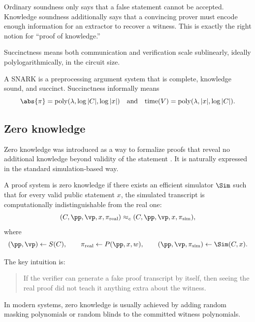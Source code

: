 \begin{remark}
Ordinary soundness only says that a false statement cannot be accepted. Knowledge soundness additionally says that a convincing prover must encode enough information for an extractor to recover a witness. This is exactly the right notion for ``proof of knowledge.''
\end{remark}

Succinctness means both communication and verification scale sublinearly, ideally polylogarithmically, in the circuit size.

\begin{definition}[SNARK]
A SNARK is a preprocessing argument system that is complete, knowledge sound, and succinct. Succinctness informally means
\[
\abs{\pi}=\mathrm{poly}(\lambda,\log |C|,\log |x|)
\quad\text{and}\quad
\mathrm{time}(V)=\mathrm{poly}(\lambda,|x|,\log |C|).
\]
\end{definition}

\subsection{Zero knowledge}

Zero knowledge was introduced as a way to formalize proofs that reveal no additional knowledge beyond validity of the statement \cite{GoldwasserMicaliRackoff1989}. It is naturally expressed in the standard simulation-based way.

\begin{definition}
A proof system is zero knowledge if there exists an efficient simulator $\Sim$ such that for every valid public statement $x$, the simulated transcript is computationally indistinguishable from the real one:
\[
(C,\pp,\vp,x,\pi_{\mathrm{real}}) \approx_c (C,\pp,\vp,x,\pi_{\mathrm{sim}}),
\]
where
\[
(\pp,\vp)\leftarrow S(C),\qquad \pi_{\mathrm{real}}\leftarrow P(\pp,x,w),\qquad (\pp,\vp,\pi_{\mathrm{sim}})\leftarrow \Sim(C,x).
\]
\end{definition}

The key intuition is:
\begin{quote}
If the verifier can generate a fake proof transcript by itself, then seeing the real proof did not teach it anything extra about the witness.
\end{quote}

In modern systems, zero knowledge is usually achieved by adding random masking polynomials or random blinds to the committed witness polynomials.

